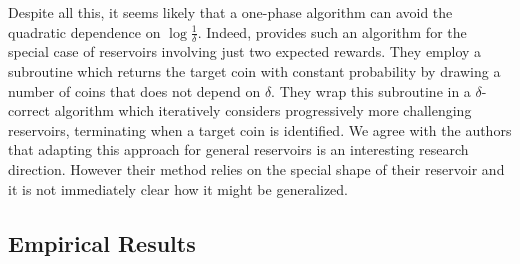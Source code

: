 Despite all this, it seems likely that a one-phase algorithm can avoid the
quadratic dependence on $\log \frac{1}{\delta}$.
Indeed, \cite{Jamieson:2016wd}
provides such an algorithm for the special case of reservoirs involving just
two expected rewards.
They employ a subroutine which 
returns the target coin with constant probability
by drawing a number of coins that does not depend on $\delta$.
They wrap this subroutine in a $\delta$-correct algorithm which iteratively
considers progressively more challenging reservoirs,
terminating when
a target coin is identified.
We agree with the authors that adapting this approach for general reservoirs is
an interesting research direction.
However their method relies on the special
shape of their reservoir
and it is not immediately clear how it might be generalized.


%

%

\subsection{Empirical Results}\label{sec-empirical}

